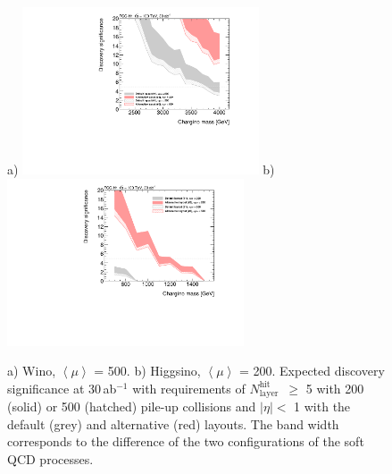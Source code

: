 \documentclass[11pt,twoside,a4paper]{cernrep}
\begin{document}
\begin{figure}
  \centering
  a)
  \includegraphics[width=7cm]{h_Significance_wino12_eta_5hits.pdf}
  b)
  \includegraphics[width=7cm]{h_Significance_higgsino12_eta_5hits.pdf}
  \caption{ a) Wino, $\left< \mu\right>$ {=} 500. b) Higgsino, $\left< \mu\right>$ {=} 200. Expected discovery significance at 30\,ab${}^{-1}$ with requirements of \ensuremath{N_{\mathrm{layer}}^{\mathrm{hit}}}~$\geq$ 5 with 200 (solid) or 500 (hatched) pile-up collisions and $|\eta|<$ 1 with the default (grey) and alternative (red) layouts.
            The band width corresponds to the difference of the two configurations of the soft QCD processes.
          }
  \label{figure:SignificanceEta1}
\end{figure}
\end{document}
